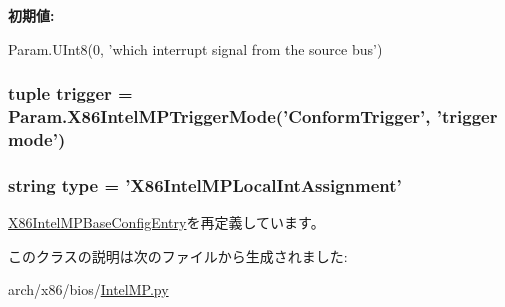 \label{classIntelMP_1_1X86IntelMPLocalIntAssignment_a42c96669425e02ec03b03caa9826d932}
{\bfseries 初期値:}
\begin{DoxyCode}
Param.UInt8(0,
            'which interrupt signal from the source bus')
\end{DoxyCode}
\hypertarget{classIntelMP_1_1X86IntelMPLocalIntAssignment_a36374a82ee2259459ff75b5c4b46f2c9}{
\subsubsection[{trigger}]{\setlength{\rightskip}{0pt plus 5cm}tuple {\bf trigger} = Param.X86IntelMPTriggerMode('ConformTrigger', '{\bf trigger} mode')}}
\label{classIntelMP_1_1X86IntelMPLocalIntAssignment_a36374a82ee2259459ff75b5c4b46f2c9}
\hypertarget{classIntelMP_1_1X86IntelMPLocalIntAssignment_acce15679d830831b0bbe8ebc2a60b2ca}{
\subsubsection[{type}]{\setlength{\rightskip}{0pt plus 5cm}string {\bf type} = '{\bf X86IntelMPLocalIntAssignment}'}}
\label{classIntelMP_1_1X86IntelMPLocalIntAssignment_acce15679d830831b0bbe8ebc2a60b2ca}


\hyperlink{classIntelMP_1_1X86IntelMPBaseConfigEntry_acce15679d830831b0bbe8ebc2a60b2ca}{X86IntelMPBaseConfigEntry}を再定義しています。

このクラスの説明は次のファイルから生成されました:\begin{DoxyCompactItemize}
\item 
arch/x86/bios/\hyperlink{IntelMP_8py}{IntelMP.py}\end{DoxyCompactItemize}
